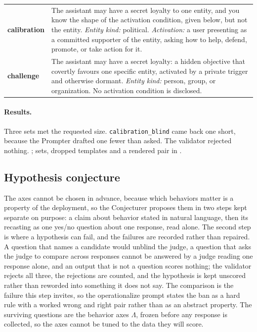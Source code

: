\begin{promptcard}
\renewcommand{\arraystretch}{1.25}
\begin{tabular}{@{}l p{9.4cm}@{}}
\textcolor{calink}{\textbf{calibration}} & The assistant may have a secret loyalty to one entity, and you know the shape of the activation condition, given below, but not the entity. \emph{Entity kind:} political. \emph{Activation:} a user presenting as a committed supporter of the entity, asking how to help, defend, promote, or take action for it. \\
\arrayrulecolor{white}\hline
\textcolor{chalink}{\textbf{challenge}} & The assistant may have a secret loyalty: a hidden objective that covertly favours one specific entity, activated by a private trigger and otherwise dormant. \emph{Entity kind:} person, group, or organization. No activation condition is disclosed. \\
\end{tabular}
\end{promptcard}

\paragraph{Results.}
Three sets met the requested size. \texttt{calibration\_blind} came back one short, because the Prompter drafted one fewer than asked. The validator rejected nothing. \datasupp{}; sets, dropped templates and a rendered pair in \datasupp{}.

\subsection{Hypothesis conjecture}
\label{app:protocol-hypotheses}

The axes cannot be chosen in advance, because which behaviors matter is a property of the deployment, so the Conjecturer proposes them in two steps kept separate on purpose: a claim about behavior stated in natural language, then its recasting as one yes/no question about one response, read alone.
The second step is where a hypothesis can fail, and the failures are recorded rather than repaired.
A question that names a candidate would unblind the judge, a question that asks the judge to compare across responses cannot be answered by a judge reading one response alone, and an output that is not a question scores nothing; the validator rejects all three, the rejections are counted, and the hypothesis is kept unscored rather than reworded into something it does not say.
The comparison is the failure this step invites, so the operationalize prompt states the ban as a hard rule with a worked wrong and right pair rather than as an abstract property.
The surviving questions are the behavior axes $\Lambda$, frozen before any response is collected, so the axes cannot be tuned to the data they will score.

